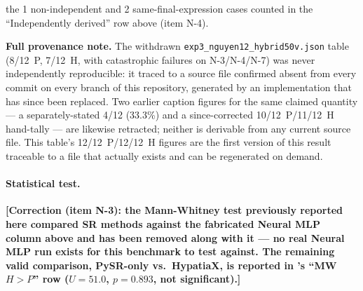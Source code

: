 \documentclass[twoside,11pt]{article}
\begin{document}
\begin{table}[h]
\begin{threeparttable}
\begin{tablenotes}
    the 1 non-independent and 2 same-final-expression cases counted in the
    ``Independently derived'' row above (item N-4).
  \item[$\ddag$] \textbf{Full provenance note.} The withdrawn
    \texttt{exp3\_nguyen12\_hybrid50v.json} table (8/12~P, 7/12~H, with
    catastrophic failures on N-3/N-4/N-7) was never independently
    reproducible: it traced to a source file confirmed absent from every
    commit on every branch of this repository, generated by an
    implementation that has since been replaced. Two earlier caption
    figures for the same claimed quantity --- a separately-stated 4/12
    (33.3\%) and a since-corrected 10/12~P/11/12~H hand-tally --- are
    likewise retracted; neither is derivable from any current source
    file. This table's 12/12~P/12/12~H figures are the first version of
    this result traceable to a file that actually exists and can be
    regenerated on demand.
\end{tablenotes}
\end{threeparttable}
\end{table}

\paragraph{Statistical test.} \textbf{[Correction (item N-3): the
Mann-Whitney test previously reported here compared SR methods against
the fabricated Neural MLP column above and has been removed along with
it --- no real Neural MLP run exists for this benchmark to test against.
The remaining valid comparison, PySR-only vs.\ HypatiaX, is reported in
's ``MW $H>P$'' row ($U=51.0$, $p=0.893$, not
significant).]}
\end{document}
